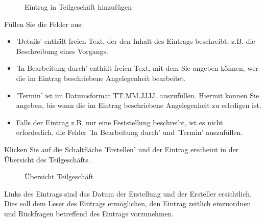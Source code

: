 \begin{figure}[H]
\caption{Eintrag in Teilgeschäft hinzufügen}
\end{figure}

Füllen Sie die Felder aus:

\begin{itemize}
\item
'Details'  enthält freien Text, der den Inhalt
des Eintrags beschreibt, z.B. die Beschreibung eines Vorgangs.
\item
'In Bearbeitung durch'  enthält freien Text, mit dem Sie angeben können, wer die im Eintrag beschriebene Angelegenheit bearbeitet.
\item
'Termin'  ist im Datumsformat TT.MM.JJJJ. auszufüllen. Hiermit können Sie angeben, bis wann die im Eintrag beschriebene Angelegenheit zu erledigen ist.
\item
Falls der Eintrag z.B. nur eine Feststellung beschreibt, ist es nicht erforderlich, die Felder 'In Bearbeitung durch' und 'Termin' auszufüllen.
\end{itemize}

Klicken Sie auf die Schaltfläche 'Erstellen'  und der Eintrag erscheint in der Übersicht des Teilgeschäfts.

\begin{figure}[H]
\caption{Übersicht Teilgeschäft}
\end{figure}

Links des Eintrags sind das Datum der Erstellung und der Ersteller  ersichtlich. Dies soll dem Leser des Eintrags ermöglichen, den Eintrag zeitlich einzuordnen und Rückfragen betreffend des Eintrags vorzunehmen.


